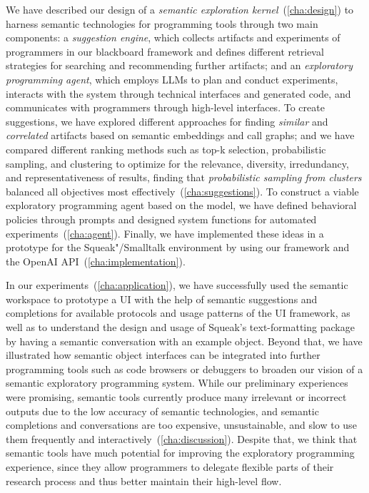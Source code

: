 We have described our design of a \emph{semantic exploration kernel}~(\cref{cha:design}) to harness semantic technologies for programming tools through two main components:
a \emph{suggestion engine}, which collects artifacts and experiments of programmers in our blackboard framework and defines different retrieval strategies for searching and recommending further artifacts;
and an \emph{exploratory programming agent}, which employs LLMs to plan and conduct experiments, interacts with the system through technical interfaces and generated code, and communicates with programmers through high-level interfaces.
To create suggestions, we have explored different approaches for finding \emph{similar} and \emph{correlated} artifacts based on semantic embeddings and call graphs; and we have compared different ranking methods such as top-k selection, probabilistic sampling, and clustering to optimize for the relevance, diversity, irredundancy, and representativeness of results, finding that \emph{probabilistic sampling from clusters} balanced all objectives most effectively~(\cref{cha:suggestions}).
To construct a viable exploratory programming agent based on the \gptfouro model, we have defined behavioral policies through prompts and designed system functions for automated experiments~(\cref{cha:agent}).
Finally, we have implemented these ideas in a prototype for the Squeak"/Smalltalk environment by using our \semtex framework and the OpenAI API~(\cref{cha:implementation}).

In our experiments~(\cref{cha:application}), we have successfully used the semantic workspace to prototype a UI with the help of semantic suggestions and completions for available protocols and usage patterns of the UI framework, as well as to understand the design and usage of Squeak's text-formatting package by having a semantic conversation with an example object.
Beyond that, we have illustrated how semantic object interfaces can be integrated into further programming tools such as code browsers or debuggers to broaden our vision of a semantic exploratory programming system.
While our preliminary experiences were promising, semantic tools currently produce many irrelevant or incorrect outputs due to the low accuracy of semantic technologies, and semantic completions and conversations are too expensive, unsustainable, and slow to use them frequently and interactively~(\cref{cha:discussion}).
Despite that, we think that semantic tools have much potential for improving the exploratory programming experience, since they allow programmers to delegate flexible parts of their research process and thus better maintain their high-level flow.

